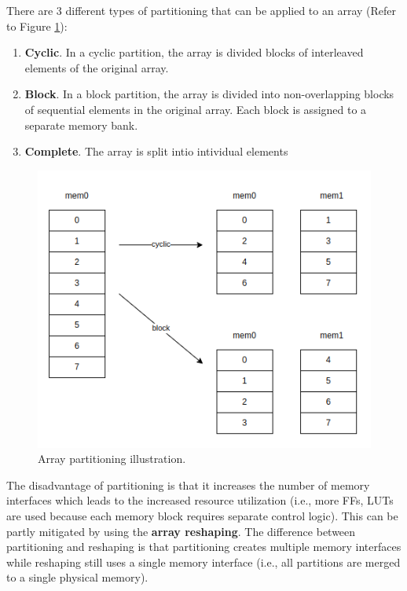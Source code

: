 \documentclass[a4paper, twoside]{report}
\theoremstyle{definition}
\numberwithin{equation}{section}
\begin{document}
There are 3 different types of partitioning that can be applied to an array (Refer to Figure \ref{fig:array_partitioning}):

\begin{enumerate}
    \item \textbf{Cyclic}.
          In a cyclic partition, the array is divided blocks of interleaved elements of the original array.
    \item \textbf{Block}.
          In a block partition, the array is divided into non-overlapping blocks of sequential elements in the original array.
          Each block is assigned to a separate memory bank.
    \item \textbf{Complete}.
          The array is split intio intividual elements
\end{enumerate}



\begin{figure}[h!]
    \centering
    \includegraphics[scale=0.5]{array_partition_illust.png}
    \caption{Array partitioning illustration.}
    \label{fig:array_partitioning}
\end{figure}


The disadvantage of partitioning is that it increases the number of memory interfaces
which leads to the increased resource utilization (i.e., more FFs, LUTs are used because each memory block requires separate control logic).
This can be partly mitigated by using the \textbf{array reshaping}.
The difference between partitioning and reshaping is that partitioning
creates multiple memory interfaces while reshaping still uses a single memory interface
(i.e., all partitions are merged to a single physical memory).
\end{document}
